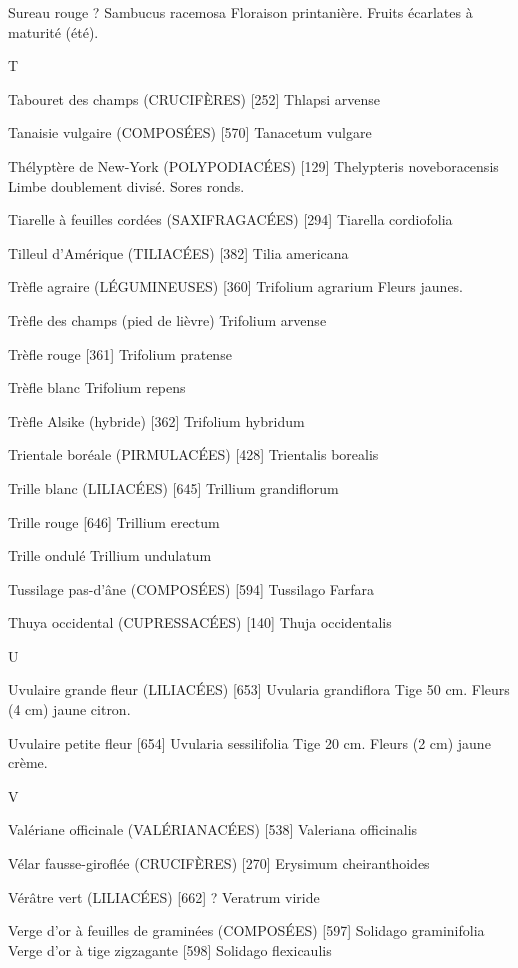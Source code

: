 \documentclass[book,12pt,a4paper,onecolumn,openany]{memoir}
\begin{document}
Sureau rouge								?
				Sambucus racemosa
Floraison printanière. Fruits écarlates à maturité (été).

T

Tabouret des champs (CRUCIFÈRES)  [252]
				Thlapsi arvense

Tanaisie vulgaire (COMPOSÉES)  [570]
				Tanacetum vulgare

Thélyptère de New-York (POLYPODIACÉES) [129]
				Thelypteris noveboracensis
Limbe doublement divisé. Sores ronds.

Tiarelle à feuilles cordées (SAXIFRAGACÉES)  [294]
				Tiarella cordiofolia

Tilleul d’Amérique (TILIACÉES)  [382]
				Tilia americana

Trèfle agraire (LÉGUMINEUSES)  [360]
				Trifolium agrarium
Fleurs jaunes.

Trèfle des champs (pied de lièvre)
				Trifolium arvense

Trèfle rouge  [361]
				Trifolium pratense


Trèfle blanc
				Trifolium repens

Trèfle Alsike (hybride)  [362]
				Trifolium hybridum

Trientale boréale (PIRMULACÉES)  [428]
				Trientalis borealis

Trille blanc (LILIACÉES)  [645]
				Trillium grandiflorum

Trille rouge  [646]
				Trillium erectum

Trille ondulé
				Trillium undulatum

Tussilage pas-d’âne (COMPOSÉES)  [594]
				Tussilago Farfara

Thuya occidental (CUPRESSACÉES) [140]
				Thuja occidentalis

U

Uvulaire grande fleur (LILIACÉES)  [653]
				Uvularia grandiflora
Tige 50 cm. Fleurs (4 cm) jaune citron.

Uvulaire petite fleur  [654]
				Uvularia sessilifolia
Tige 20 cm. Fleurs (2 cm) jaune crème.

V

Valériane officinale (VALÉRIANACÉES)  [538]
				Valeriana officinalis

Vélar fausse-giroflée (CRUCIFÈRES)  [270]
				Erysimum cheiranthoides

Vérâtre vert (LILIACÉES)  [662]						?
				Veratrum viride

Verge d’or à feuilles de graminées (COMPOSÉES)  [597]
				Solidago graminifolia
Verge d’or à tige zigzagante  [598]
				Solidago flexicaulis
\end{document}
